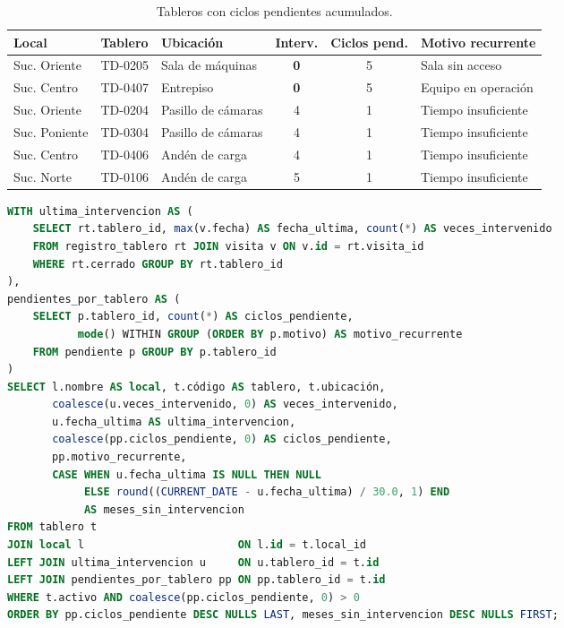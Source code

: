 \documentclass[10pt,letterpaper]{article}
\begin{document}
\begin{table}[H]
\centering
\small
\begin{tabular}{@{}lllccl@{}}
\toprule
\textbf{Local} & \textbf{Tablero} & \textbf{Ubicación} & \textbf{Interv.} & \textbf{Ciclos pend.} & \textbf{Motivo recurrente} \\
\midrule
Suc. Oriente  & TD-0205 & Sala de máquinas    & \textbf{0} & 5 & Sala sin acceso \\
Suc. Centro   & TD-0407 & Entrepiso           & \textbf{0} & 5 & Equipo en operación \\
Suc. Oriente  & TD-0204 & Pasillo de cámaras  & 4 & 1 & Tiempo insuficiente \\
Suc. Poniente & TD-0304 & Pasillo de cámaras  & 4 & 1 & Tiempo insuficiente \\
Suc. Centro   & TD-0406 & Andén de carga      & 4 & 1 & Tiempo insuficiente \\
Suc. Norte    & TD-0106 & Andén de carga      & 5 & 1 & Tiempo insuficiente \\
\bottomrule
\end{tabular}
\caption{Tableros con ciclos pendientes acumulados.}
\end{table}

\begin{lstlisting}[language=SQL]
WITH ultima_intervencion AS (
    SELECT rt.tablero_id, max(v.fecha) AS fecha_ultima, count(*) AS veces_intervenido
    FROM registro_tablero rt JOIN visita v ON v.id = rt.visita_id
    WHERE rt.cerrado GROUP BY rt.tablero_id
),
pendientes_por_tablero AS (
    SELECT p.tablero_id, count(*) AS ciclos_pendiente,
           mode() WITHIN GROUP (ORDER BY p.motivo) AS motivo_recurrente
    FROM pendiente p GROUP BY p.tablero_id
)
SELECT l.nombre AS local, t.código AS tablero, t.ubicación,
       coalesce(u.veces_intervenido, 0) AS veces_intervenido,
       u.fecha_ultima AS ultima_intervencion,
       coalesce(pp.ciclos_pendiente, 0) AS ciclos_pendiente,
       pp.motivo_recurrente,
       CASE WHEN u.fecha_ultima IS NULL THEN NULL
            ELSE round((CURRENT_DATE - u.fecha_ultima) / 30.0, 1) END
            AS meses_sin_intervencion
FROM tablero t
JOIN local l                        ON l.id = t.local_id
LEFT JOIN ultima_intervencion u     ON u.tablero_id = t.id
LEFT JOIN pendientes_por_tablero pp ON pp.tablero_id = t.id
WHERE t.activo AND coalesce(pp.ciclos_pendiente, 0) > 0
ORDER BY pp.ciclos_pendiente DESC NULLS LAST, meses_sin_intervencion DESC NULLS FIRST;
\end{lstlisting}
\end{document}
